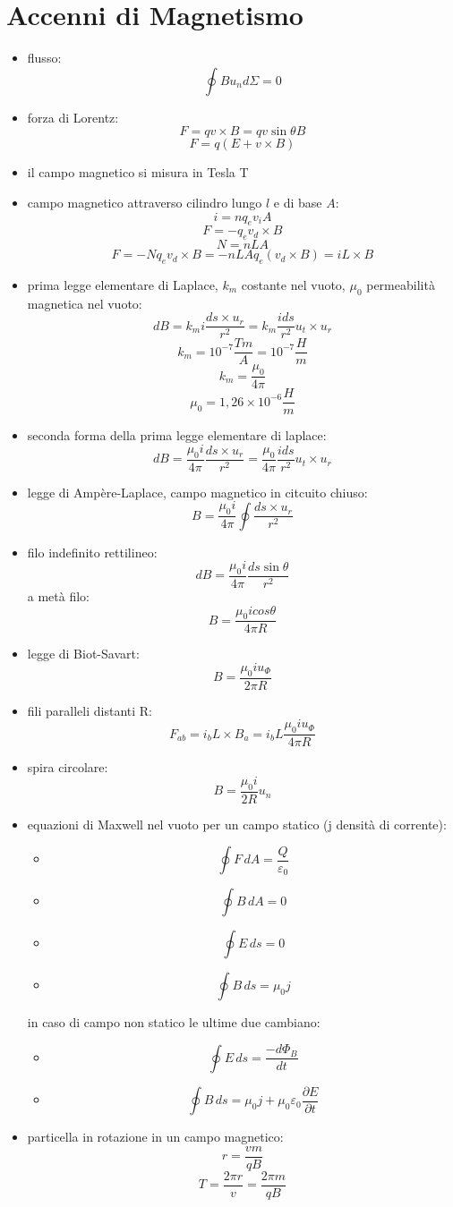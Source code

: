\documentclass[a4paper,12pt, oneside]{book}
\begin{document}
\section{Accenni di Magnetismo}
\begin{itemize}
\item flusso:
$$\oint Bu_nd\Sigma=0$$
\item forza di Lorentz:
$$F=qv\times B=qv\sin\theta B$$
$$F=q(E+v\times B)$$
\item il campo magnetico si misura in Tesla T
\item campo magnetico attraverso cilindro lungo $l$ e di base $A$:
$$i=nq_ev_iA$$
$$F=-q_ev_d\times B$$
$$N=nLA$$
$$F=-Nq_ev_d\times B=-nLAq_e(v_d\times B)=iL\times B$$
\item prima legge elementare di Laplace, $k_m$ costante nel vuoto, $\mu_0$ permeabilità magnetica nel vuoto:
$$dB=k_mi\frac{ds\times u_r}{r^2}=k_m\frac{ids}{r^2}u_t\times u_r$$
$$k_m=10^{-7}\frac{Tm}{A}=10^{-7}\frac{H}{m}$$
$$k_m=\frac{\mu_0}{4\pi}$$
$$\mu_0=1,26\times 10^{-6}\frac{H}{m}$$
\item seconda forma della prima legge elementare di laplace:
$$dB=\frac{\mu_0i}{4\pi}\frac{ds\times u_r}{r^2}=\frac{\mu_0}{4\pi}\frac{ids}{r^2}u_t\times u_r$$
\item legge di Ampère-Laplace, campo magnetico in citcuito chiuso:
$$B=\frac{\mu_0i}{4\pi}\oint\frac{ds\times u_r}{r^2}$$
\item filo indefinito rettilineo:
$$dB=\frac{\mu_0i}{4\pi}\frac{ds\sin\theta}{r^2}$$
a metà filo:
$$B=\frac{\mu_0icos\theta}{4\pi R}$$
\item legge di Biot-Savart:
$$B=\frac{\mu_0 iu_\Phi}{2\pi R}$$
\item fili paralleli distanti R:
$$F_{ab}=i_bL\times B_a=i_bL\frac{\mu_0iu_\Phi}{4\pi R}$$
\item spira circolare:
$$B=\frac{\mu_0i}{2 R}u_n$$
\item equazioni di Maxwell nel vuoto per un campo statico (j densità di corrente):
\begin{itemize}
\item $$\oint F\,dA=\frac{Q}{\varepsilon_0}$$
\item  $$\oint B\,dA=0$$
\item  $$\oint E\,ds=0$$
\item  $$\oint B\,ds=\mu_0 j$$
\end{itemize}
in caso di campo non statico le ultime due cambiano:
\begin{itemize}
\item  $$\oint E\,ds=\frac{-d\Phi_B}{dt}$$
\item  $$\oint B\,ds=\mu_0 j+\mu_0\varepsilon_0\frac{\partial E}{\partial t}$$
\end{itemize}
\item particella in rotazione in un campo magnetico:
$$r=\frac{vm}{qB}$$
$$T=\frac{2\pi r}{v}=\frac{2\pi m}{qB}$$

\end{itemize}
\end{document}
